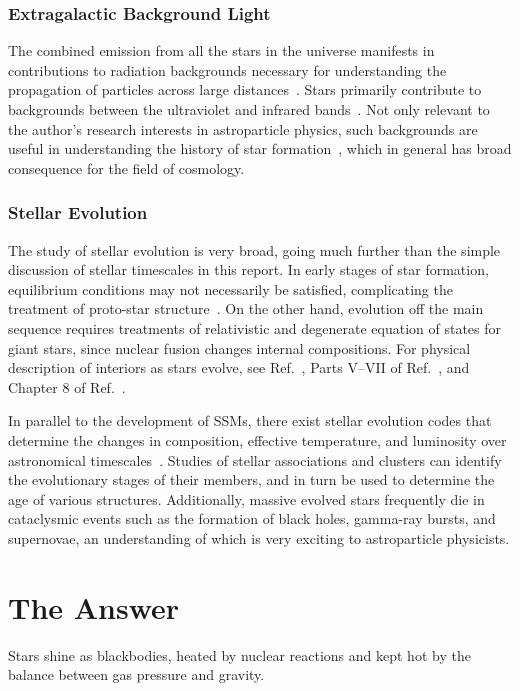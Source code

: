 \documentclass[12pt]{article}
\begin{document}
\subsubsection{Extragalactic Background Light}
The combined emission from all the stars in the universe manifests in contributions to radiation backgrounds necessary for understanding the propagation of particles across large distances~\cite{Aharonian}. Stars primarily contribute to backgrounds between the ultraviolet and infrared bands~\cite{Franceschini_2008}. Not only relevant to the author's research interests in astroparticle physics, such backgrounds are useful in understanding the history of star formation~\cite{Cooray2016}, which in general has broad consequence for the field of cosmology.

\subsubsection{Stellar Evolution}
The study of stellar evolution is very broad, going much further than the simple discussion of stellar timescales in this report. In early stages of star formation, equilibrium conditions may not necessarily be satisfied, complicating the treatment of proto-star structure~\cite{Christensen_Dalsgaard_2021}. On the other hand, evolution off the main sequence requires treatments of relativistic and degenerate equation of states for giant stars, since nuclear fusion changes internal compositions. For physical description of interiors as stars evolve, see Ref.~\cite{Cox_Giuli_vol2}, Parts V--VII of Ref.~\cite{KWW_book}, and Chapter 8 of Ref.~\cite{HK_book}.

In parallel to the development of SSMs, there exist stellar evolution codes that determine the changes in composition, effective temperature, and luminosity over astronomical timescales~\cite{Scuflaire_2007}. Studies of stellar associations and clusters can identify the evolutionary stages of their members, and in turn be used to determine the age of various structures. Additionally, massive evolved stars frequently die in cataclysmic events such as the formation of black holes, gamma-ray bursts, and supernovae, an understanding of which is very exciting to astroparticle physicists. 

\section{The Answer}

Stars shine as blackbodies, heated by nuclear reactions and kept hot by the balance between gas pressure and gravity. 
\end{document}
